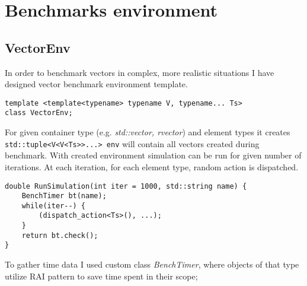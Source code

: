 \documentclass[inz, english, shortabstract]{iithesis}
\begin{document}
\chapter{Benchmarks environment}
\section{VectorEnv}
In order to benchmark vectors in complex, more realistic situations I have designed vector benchmark environment template.

\begin{lstlisting}[caption=VectorEnv declaration]
template <template<typename> typename V, typename... Ts>
class VectorEnv;
\end{lstlisting}
For given container type (e.g. {\it std::vector, rvector}) and element types it creates 
\lstinline{std::tuple<V<V<Ts>>...> env}
will contain all vectors created during benchmark. 
With created environment simulation can be run for given number of iterations.
At each iteration, for each element type, random action is dispatched.
\begin{lstlisting}[caption=RunSimulation]
double RunSimulation(int iter = 1000, std::string name) {
	BenchTimer bt(name);
	while(iter--) {
		(dispatch_action<Ts>(), ...);
	}
	return bt.check();
}
\end{lstlisting}
To gather time data I used custom class {\it BenchTimer}, where objects of that type utilize RAI pattern to save time spent in their scope;

\clearpage
\end{document}
